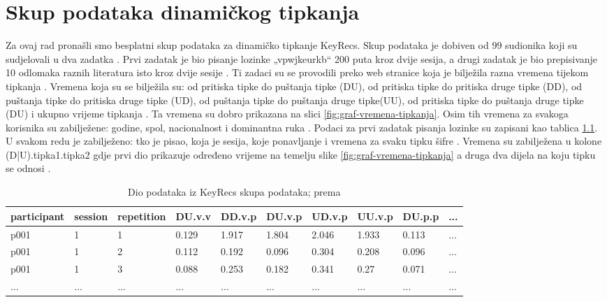 \documentclass[]{foi}
\begin{document}
\chapter{Skup podataka dinamičkog tipkanja}
Za ovaj rad pronašli smo besplatni skup podataka za dinamičko tipkanje KeyRecs. Skup podataka je dobiven od 99 sudionika koji su sudjelovali u dva zadatka  \cite{Dias2023}. Prvi zadatak je bio pisanje lozinke „vpwjkeurkb“ 200 puta kroz dvije sesija, a drugi zadatak je bio prepisivanje 10 odlomaka raznih literatura isto kroz dvije sesije \cite{Dias2023}. Ti zadaci su se provodili preko web stranice koja je bilježila razna vremena tijekom tipkanja \cite{Dias2023}. Vremena koja su se bilježila su: od pritiska tipke do puštanja tipke (DU), od pritiska tipke do pritiska druge tipke (DD), od puštanja tipke do pritiska druge tipke (UD), od puštanja tipke do puštanja druge tipke(UU), od pritiska tipke do puštanja druge tipke (DU) i ukupno vrijeme tipkanja \cite{Dias2023}. Ta vremena su dobro prikazana na slici \ref{fig:graf-vremena-tipkanja}. Osim tih vremena za svakoga korisnika su  zabilježene: godine, spol, nacionalnost i dominantna ruka  \cite{Dias2023}. Podaci za prvi zadatak pisanja lozinke su zapisani kao tablica \ref{tab:KeyRecs-podaci}. U svakom redu je zabilježeno: tko je pisao, koja je sesija, koje ponavljanje i vremena za svaku tipku šifre \cite{Dias2023}. Vremena su zabilježena u kolone (D|U).tipka1.tipka2 gdje prvi dio prikazuje određeno vrijeme na temelju slike \ref{fig:graf-vremena-tipkanja} a druga dva dijela na koju tipku se odnosi \cite{Dias2023}.

\begin{table}[!h]
    \centering
    \caption{Dio podataka iz KeyRecs skupa podataka; prema \cite{Dias2023}}
    \begin{tabularx}{1\textwidth}{|l|l|l|l|l|l|l|l|l|l|}
    \hline
        \cellcolor{gray!25}participant & \cellcolor{gray!25}session & \cellcolor{gray!25}repetition & \cellcolor{gray!25}DU.v.v & \cellcolor{gray!25}DD.v.p & \cellcolor{gray!25}DU.v.p & \cellcolor{gray!25}UD.v.p & \cellcolor{gray!25}UU.v.p & \cellcolor{gray!25}DU.p.p & \cellcolor{gray!25}... \\ \hline
        p001 & 1 & 1 & 0.129 & 1.917 & 1.804 & 2.046 & 1.933 & 0.113 & ... \\ \hline
        p001 & 1 & 2 & 0.112 & 0.192 & 0.096 & 0.304 & 0.208 & 0.096 & ... \\ \hline
        p001 & 1 & 3 & 0.088 & 0.253 & 0.182 & 0.341 & 0.27 & 0.071 & ... \\ \hline
        ... & ... & ... & ... & ... & ... & ... & ... & ... & ... \\ \hline
    \end{tabularx}
    \\[10pt]
    \label{tab:KeyRecs-podaci}
\end{table}
\end{document}
